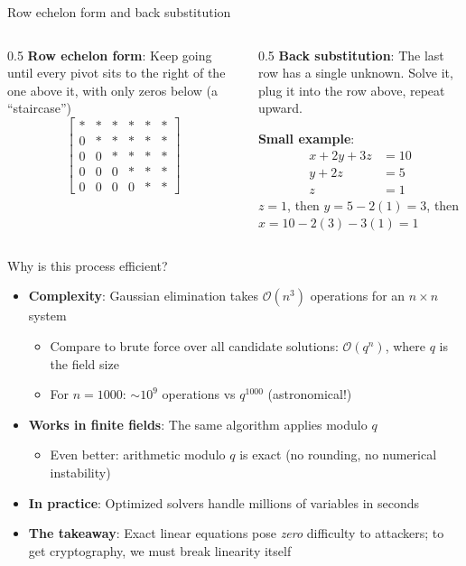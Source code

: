\ifdefined\PRESENTATION\else\PassOptionsToClass{handout}{beamer}\fi\documentclass[aspectratio=169, lualatex]{beamer}
\begin{document}
\begin{frame}{Row echelon form and back substitution}
	\begin{columns}[c]
		\begin{column}{0.5\textwidth}
			\textbf{Row echelon form}: Keep going until every pivot sits to the right of the one above it, with only zeros below (a ``staircase'')
			\[
				\left[\begin{array}{ccccc|c}
						\ast & \ast & \ast & \ast & \ast & \ast \\
						0    & \ast & \ast & \ast & \ast & \ast \\
						0    & 0    & \ast & \ast & \ast & \ast \\
						0    & 0    & 0    & \ast & \ast & \ast \\
						0    & 0    & 0    & 0    & \ast & \ast
					\end{array}\right]
			\]
		\end{column}
		\begin{column}{0.5\textwidth}
			\textbf{Back substitution}: The last row has a single unknown. Solve it, plug it into the row above, repeat upward.

			\textbf{Small example}:
			\begin{align*}
				x + 2y + 3z & = 10 \\
				y + 2z      & = 5  \\
				z           & = 1
			\end{align*}
			$z = 1$, then $y = 5 - 2(1) = 3$, then $x = 10 - 2(3) - 3(1) = 1$
		\end{column}
	\end{columns}
\end{frame}

\begin{frame}{Why is this process efficient?}
	\begin{itemize}
		\item \textbf{Complexity}: Gaussian elimination takes $\mathcal{O}(n^3)$ operations for an $n \times n$ system
		      \begin{itemize}
			      \item Compare to brute force over all candidate solutions: $\mathcal{O}(q^n)$, where $q$ is the field size
			      \item For $n=1000$: $\sim 10^9$ operations vs $q^{1000}$ (astronomical!)
		      \end{itemize}
		\item \textbf{Works in finite fields}: The same algorithm applies modulo $q$
		      \begin{itemize}
			      \item Even better: arithmetic modulo $q$ is exact (no rounding, no numerical instability)
		      \end{itemize}
		\item \textbf{In practice}: Optimized solvers handle millions of variables in seconds
		\item \textbf{The takeaway}: Exact linear equations pose \textit{zero} difficulty to attackers; to get cryptography, we must break linearity itself
	\end{itemize}
\end{frame}
\end{document}
